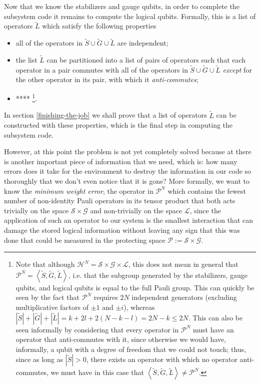 \documentclass[twocolumn,showpacs,preprintnumbers,amsmath,amssymb,nofootinbib,pra,floatfix]{revtex4}
\begin{document}
Now that we know the stabilizers and gauge qubits, in order to
complete the subsystem code it remains to compute the logical
qubits. Formally, this is a list of operators $\tilde L$ which satisfy
the following properties
\begin{itemize}
\item all of the operators in $\tilde S \cup \tilde G \cup \tilde L$
  are independent;
\item the list $\tilde L$ can be partitioned into a list of pairs of
  operators such that each operator in a pair commutes with all of the
  operators in $\tilde S \cup \tilde G \cup \tilde L$ \emph{except}
  for the other operator in its pair, with which it
  \emph{anti-commutes};
\item **** \footnote{Note that although $\mathscr{H}^N=\mathscr{S}\times\mathscr{G}\times\mathscr{L}$, this does not mean in general that $\mathcal{P}^N=\left<\tilde S,\tilde G,\tilde L\right>$, i.e. that the subgroup generated by the stabilizers, gauge qubits, and logical qubits is equal to the full Pauli group.  This can quickly be seen by the fact that $\mathcal{P}^N$ requires $2N$ independent generators (excluding multiplicative factors of $\pm 1$ and $\pm i$), whereas $|\tilde S|+|\tilde G|+|\tilde L|=k+2l+2(N-k-l)=2N-k\le 2N$.  This can also be seen informally by considering that every operator in $\mathcal{P}^N$ must have an operator that anti-commutes with it, since otherwise we would have, informally, a qubit with a degree of freedom that we could not touch; thus, since as long as $|\tilde S|>0$, there exists an operator with which no operator anti-commutes, we must have in this case that $\left<\tilde S,\tilde G,\tilde L\right>\ne \mathcal{P}^N$.}.
\end{itemize}
In section \ref{finishing-the-job} we shall prove that a list of operators $\tilde L$ can be constructed with these properties, which is the final step in computing the subsystem code.

However, at this point the problem is not yet completely solved because at there is another important piece of information that we need, which is:  how many errors does it take for the environment to destroy the information in our code so thoroughly that we don't even notice that it is gone?  More formally, we want to know the \emph{minimum weight error}, the operator in $\mathcal{P}^N$ which contains the fewest number of non-identity Pauli operators in its tensor product that both acts trivially on the space $\mathscr{S}\times\mathscr{G}$ and non-trivially on the space $\mathscr{L}$, since the application of such an operator to our system is the smallest interaction that can damage the stored logical information without leaving any sign that this was done that could be measured in the protecting space $\mathscr{P}:=\mathscr{S}\times\mathscr{G}$.
\end{document}
